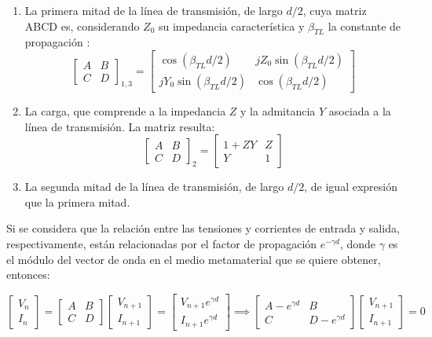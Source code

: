 \begin{enumerate}
	\item La primera mitad de la línea de transmisión, de largo $d/2$, cuya matriz ABCD es, considerando $Z_0$ su impedancia característica y $\beta_{TL}$ la constante de propagación \cite{Pozar:MwEngineering}:
	\begin{equation}
		\begin{bmatrix}
			A & B \\
			C & D
		\end{bmatrix}_{1,3}
		=
		\begin{bmatrix}
			\cos(\beta_{TL} d/2) & j Z_0 \sin(\beta_{TL} d/2) \\
			j Y_0 \sin(\beta_{TL} d/2) & \cos(\beta_{TL} d/2)
		\end{bmatrix}
	\end{equation}
	\item La carga, que comprende a la impedancia $Z$ y la admitancia $Y$ asociada a la línea de transmisión. La matriz resulta:
	\begin{equation}
		\begin{bmatrix}
			A & B \\
			C & D
		\end{bmatrix}_{2}
		=
		\begin{bmatrix}
			1+ZY & Z \\
			Y & 1
		\end{bmatrix}
	\end{equation}
	\item La segunda mitad de la línea de transmisión, de largo $d/2$, de igual expresión que la primera mitad.
\end{enumerate}

Si se considera que la relación entre las tensiones y corrientes de entrada y salida, respectivamente, están relacionadas por el factor de propagación $e^{-\gamma d}$, donde $\gamma$ es el módulo del vector de onda en el medio metamaterial que se quiere obtener, entonces:

\begin{equation}
	\begin{bmatrix}
		V_n \\ I_n
	\end{bmatrix}
	=
	\begin{bmatrix}
	A & B \\
	C & D
	\end{bmatrix}
	\begin{bmatrix}
	V_{n+1} \\
	I_{n+1}
	\end{bmatrix}
	=
	\begin{bmatrix}
	V_{n+1}e^{\gamma d} \\ 
	I_{n+1}e^{\gamma d}
	\end{bmatrix}
	\implies
	\begin{bmatrix}
	A-e^{\gamma d} & B \\
	C & D-e^{\gamma d}
	\end{bmatrix}
	\begin{bmatrix}
	V_{n+1} \\ I_{n+1}
	\end{bmatrix}
	= 0
\end{equation}

